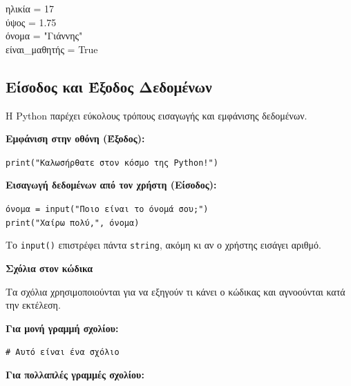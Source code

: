 \documentclass[11pt]{report}
\begin{document}
\begin{tcolorbox}[colback=gray!5!white, colframe=black!75!black]
ηλικία = 17 \\
ύψος = 1.75 \\
όνομα = "Γιάννης" \\
είναι\_μαθητής = True
\end{tcolorbox}

\vspace{1em}

\subsection*{Είσοδος και Έξοδος Δεδομένων}

Η Python παρέχει εύκολους τρόπους εισαγωγής και εμφάνισης δεδομένων.

\vspace{1em}
\textbf{Εμφάνιση στην οθόνη (Έξοδος):}

\begin{tcolorbox}[colback=gray!5!white, colframe=black!75!black]
\texttt{print("Καλωσήρθατε στον κόσμο της Python!")}
\end{tcolorbox}

\vspace{1em}
\textbf{Εισαγωγή δεδομένων από τον χρήστη (Είσοδος):}

\begin{tcolorbox}[colback=gray!5!white, colframe=black!75!black]
\texttt{όνομα = input("Ποιο είναι το όνομά σου;")} \\
\texttt{print("Χαίρω πολύ,", όνομα)}
\end{tcolorbox}

\vspace{1em}
Το \texttt{input()} επιστρέφει πάντα \texttt{string}, ακόμη κι αν ο χρήστης εισάγει αριθμό.

\vspace{1em}
\textbf{Σχόλια στον κώδικα}

Τα σχόλια χρησιμοποιούνται για να εξηγούν τι κάνει ο κώδικας και αγνοούνται κατά την εκτέλεση.

\vspace{1em}
\textbf{Για μονή γραμμή σχολίου:}

\begin{tcolorbox}[colback=gray!5!white, colframe=black!75!black]
\texttt{\# Αυτό είναι ένα σχόλιο}
\end{tcolorbox}

\vspace{1em}
\textbf{Για πολλαπλές γραμμές σχολίου:}
\end{document}
